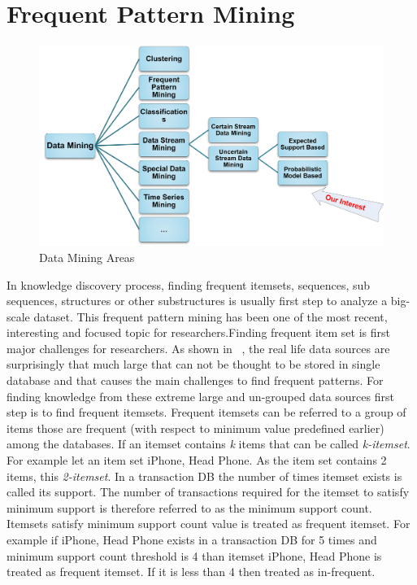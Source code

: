 \section{Frequent Pattern Mining}
\begin{figure}
\centering
  \includegraphics[width=.9\textwidth]{images/mining_class.jpg}
\caption{Data Mining Areas}
\label{figure:mining_class}
\end{figure}
In knowledge discovery process, finding frequent itemsets, sequences, sub sequences, structures or other substructures is usually first step to analyze a big-scale dataset. This frequent pattern mining has been one of the most recent, interesting and focused topic for  researchers.Finding frequent item set is first major challenges for researchers. As shown in ~\cite{apriori}, the real life data sources are surprisingly that much large that can not be thought to be stored in single database and that causes the main challenges to find frequent patterns. For finding knowledge from these extreme large and un-grouped data sources first step is to find frequent itemsets. Frequent itemsets can be referred to a group of items those are frequent (with respect to minimum value predefined earlier) among the databases. If an itemset contains \emph{k} items that can be called \emph{k-itemset}. For example let an item set {iPhone, Head Phone}. As the item set contains 2 items, this \emph{2-itemset}. In a transaction DB the number of times itemset exists is called its support. The number of transactions required for the itemset to satisfy minimum support is therefore referred to as the minimum support count. Itemsets satisfy minimum support count value is treated as frequent itemset. For example if {iPhone, Head Phone} exists in a transaction DB for 5 times and minimum support count threshold is 4 than itemset {iPhone, Head Phone} is treated as frequent itemset. If it is less than 4 then treated as  in-frequent.\\
